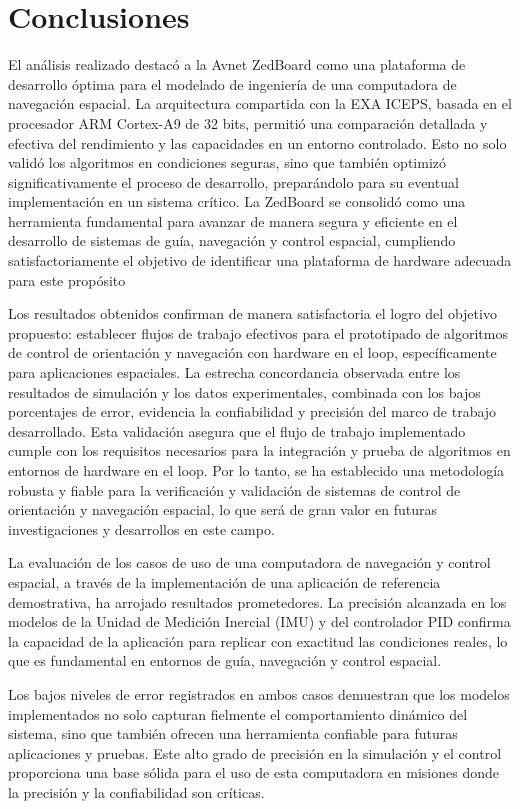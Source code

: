 \chapter{Conclusiones}

El análisis realizado destacó a la Avnet ZedBoard como una plataforma de desarrollo óptima para el modelado de ingeniería de una computadora de navegación espacial. La arquitectura compartida con la EXA ICEPS, basada en el procesador ARM Cortex-A9 de 32 bits, permitió una comparación detallada y efectiva del rendimiento y las capacidades en un entorno controlado. Esto no solo validó los algoritmos en condiciones seguras, sino que también optimizó significativamente el proceso de desarrollo, preparándolo para su eventual implementación en un sistema crítico. La ZedBoard se consolidó como una herramienta fundamental para avanzar de manera segura y eficiente en el desarrollo de sistemas de guía, navegación y control espacial, cumpliendo satisfactoriamente el objetivo de identificar una plataforma de hardware adecuada para este propósito

Los resultados obtenidos confirman de manera satisfactoria el logro del objetivo propuesto: establecer flujos de trabajo efectivos para el prototipado de algoritmos de control de orientación y navegación con hardware en el loop, específicamente para aplicaciones espaciales. La estrecha concordancia observada entre los resultados de simulación y los datos experimentales, combinada con los bajos porcentajes de error, evidencia la confiabilidad y precisión del marco de trabajo desarrollado. Esta validación asegura que el flujo de trabajo implementado cumple con los requisitos necesarios para la integración y prueba de algoritmos en entornos de hardware en el loop. Por lo tanto, se ha establecido una metodología robusta y fiable para la verificación y validación de sistemas de control de orientación y navegación espacial, lo que será de gran valor en futuras investigaciones y desarrollos en este campo.

La evaluación de los casos de uso de una computadora de navegación y control espacial, a través de la implementación de una aplicación de referencia demostrativa, ha arrojado resultados prometedores. La precisión alcanzada en los modelos de la Unidad de Medición Inercial (IMU) y del controlador PID confirma la capacidad de la aplicación para replicar con exactitud las condiciones reales, lo que es fundamental en entornos de guía, navegación y control espacial.

Los bajos niveles de error registrados en ambos casos demuestran que los modelos implementados no solo capturan fielmente el comportamiento dinámico del sistema, sino que también ofrecen una herramienta confiable para futuras aplicaciones y pruebas. Este alto grado de precisión en la simulación y el control proporciona una base sólida para el uso de esta computadora en misiones donde la precisión y la confiabilidad son críticas.